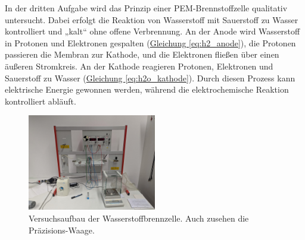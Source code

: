 In der dritten Aufgabe wird das Prinzip einer PEM-Brennstoffzelle qualitativ untersucht. Dabei erfolgt die Reaktion von Wasserstoff mit Sauerstoff zu Wasser kontrolliert und „kalt“ ohne offene Verbrennung. An der Anode wird Wasserstoff in Protonen und Elektronen gespalten (\hyperref[eq:h2_anode]{Gleichung \ref*{eq:h2_anode}}), die Protonen passieren die Membran zur Kathode, und die Elektronen fließen über einen äußeren Stromkreis. An der Kathode reagieren Protonen, Elektronen und Sauerstoff zu Wasser (\hyperref[eq:h2o_kathode]{Gleichung \ref*{eq:h2o_kathode}}). Durch diesen Prozess kann elektrische Energie gewonnen werden, während die elektrochemische Reaktion kontrolliert abläuft.
\begin{figure}[t]
    \includegraphics[width=0.5\textwidth]{img/21/Elektrolyse_Bild.jpg}
    \caption{Versuchsaufbau der Wasserstoffbrennzelle. Auch zusehen die Präzisions-Waage.}
    \label{fig:log_gezeichnet}
\end{figure}